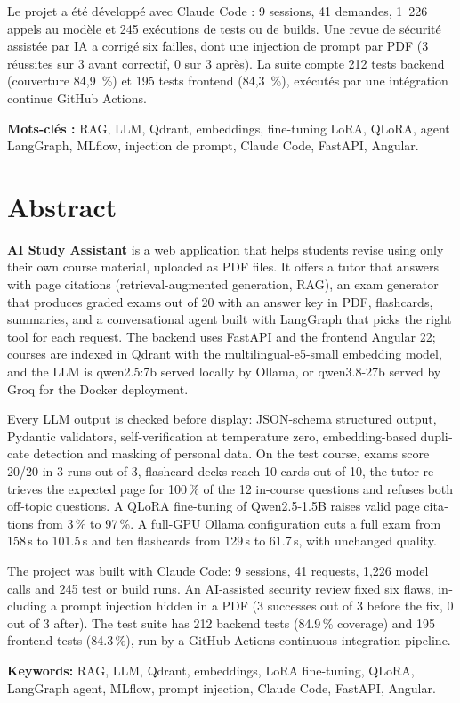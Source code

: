 \documentclass[12pt,a4paper]{report}
\begin{document}
Le projet a été développé avec Claude Code : 9 sessions, 41 demandes, 1~226 appels au modèle et
245 exécutions de tests ou de builds. Une revue de sécurité assistée par IA a corrigé six failles, dont
une injection de prompt par PDF (3 réussites sur 3 avant correctif, 0 sur 3 après). La suite compte
212 tests backend (couverture 84,9~\%) et 195 tests frontend (84,3~\%), exécutés par une intégration
continue GitHub Actions.

\textbf{Mots-clés :} RAG, LLM, Qdrant, embeddings, fine-tuning LoRA, QLoRA, agent LangGraph, MLflow,
injection de prompt, Claude Code, FastAPI, Angular.

\chapter*{Abstract}

\begin{otherlanguage}{english}
\textbf{AI Study Assistant} is a web application that helps students revise using only their own
course material, uploaded as PDF files. It offers a tutor that answers with page citations
(retrieval-augmented generation, RAG), an exam generator that produces graded exams out of 20 with an
answer key in PDF, flashcards, summaries, and a conversational agent built with LangGraph that picks the
right tool for each request. The backend uses FastAPI and the frontend Angular 22; courses are indexed in
Qdrant with the multilingual-e5-small embedding model, and the LLM is qwen2.5:7b served locally by Ollama,
or qwen3.8-27b served by Groq for the Docker deployment.

Every LLM output is checked before display: JSON-schema structured output, Pydantic validators,
self-verification at temperature zero, embedding-based duplicate detection and masking of personal data.
On the test course, exams score 20/20 in 3 runs out of 3, flashcard decks reach 10 cards out of 10, the
tutor retrieves the expected page for 100\,\% of the 12 in-course questions and refuses both off-topic
questions. A QLoRA fine-tuning of Qwen2.5-1.5B raises valid page citations from 3\,\% to 97\,\%. A
full-GPU Ollama configuration cuts a full exam from 158\,s to 101.5\,s and ten flashcards from 129\,s to
61.7\,s, with unchanged quality.

The project was built with Claude Code: 9 sessions, 41 requests, 1,226 model calls and 245 test or build
runs. An AI-assisted security review fixed six flaws, including a prompt injection hidden in a PDF
(3 successes out of 3 before the fix, 0 out of 3 after). The test suite has 212 backend tests (84.9\,\%
coverage) and 195 frontend tests (84.3\,\%), run by a GitHub Actions continuous integration pipeline.

\textbf{Keywords:} RAG, LLM, Qdrant, embeddings, LoRA fine-tuning, QLoRA, LangGraph agent, MLflow,
prompt injection, Claude Code, FastAPI, Angular.
\end{otherlanguage}
\end{document}
